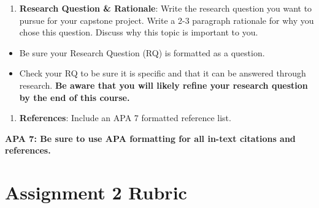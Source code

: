 \documentclass[
  letterpaper,
  DIV=11,
  numbers=noendperiod]{scrreprt}
\providecommand{\tightlist}{%
  \setlength{\itemsep}{0pt}\setlength{\parskip}{0pt}}\usepackage{longtable,booktabs,array}
\begin{document}
\begin{enumerate}
\def\labelenumi{\arabic{enumi}.}
\tightlist
\item
  \textbf{Research Question \& Rationale}: Write the research question
  you want to pursue for your capstone project. Write a 2-3 paragraph
  rationale for why you chose this question. Discuss why this topic is
  important to you.
\end{enumerate}

\begin{itemize}
\tightlist
\item
  Be sure your Research Question (RQ) is formatted as a question.
\item
  Check your RQ to be sure it is specific and that it can be answered
  through research. \textbf{Be aware that you will likely refine your
  research question by the end of this course.}
\end{itemize}

\begin{enumerate}
\def\labelenumi{\arabic{enumi}.}
\tightlist
\item
  \textbf{References}: Include an APA 7 formatted reference list.
\end{enumerate}

\textbf{APA 7: Be sure to use APA formatting for all in-text citations
and references.}

\section{Assignment 2 Rubric}\label{assignment-2-rubric}
\end{document}
